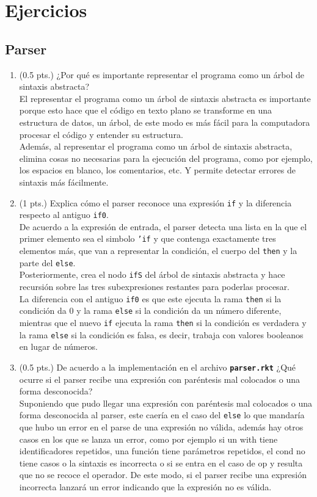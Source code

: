\documentclass[11pt]{article}
\begin{document}
\section{Ejercicios}
\subsection{Parser}
\begin{enumerate}
    \item (0.5 pts.) ¿Por qué es importante representar el programa como un árbol de sintaxis abstracta?\\
    El representar el programa como un árbol de sintaxis abstracta es importante porque esto hace que el código en texto plano se transforme en una estructura de datos, un árbol, de este modo es más fácil para la computadora procesar el código y entender su estructura.\\
    Además, al representar el programa como un árbol de sintaxis abstracta, elimina cosas no necesarias para la ejecución del programa, como por ejemplo, los espacios en blanco, los comentarios, etc. Y permite detectar errores de sintaxis más fácilmente.
    \item (1 pts.) Explica cómo el parser reconoce una expresión \texttt{if} y la diferencia respecto al antiguo \texttt{if0}.\\
    De acuerdo a la expresión de entrada, el parser detecta una lista en la que el primer elemento sea el simbolo \texttt{'if} y que contenga exactamente tres elementos más, que van a representar la condición, el cuerpo del \texttt{then} y la parte del \texttt{else}.\\
    Posteriormente, crea el nodo \texttt{ifS} del árbol de sintaxis abstracta y hace recursión sobre las tres subexpresiones restantes para poderlas procesar.\\
    La diferencia con el antiguo \texttt{if0} es que este ejecuta la rama \texttt{then} si la condición da 0 y la rama \texttt{else} si la condición da un número diferente, mientras que el nuevo \texttt{if} ejecuta la rama \texttt{then} si la condición es verdadera y la rama \texttt{else} si la condición es falsa, es decir, trabaja con valores booleanos en lugar de números.
    \item (0.5 pts.) De acuerdo a la implementación en el archivo \texttt{\textbf{parser.rkt}} ¿Qué ocurre si el parser recibe una expresión con paréntesis mal colocados o una forma desconocida?\\
    Suponiendo que pudo llegar una expresión con paréntesis mal colocados o una forma desconocida al parser, este caería en el caso del \texttt{else} lo que mandaría que hubo un error en el parse de una expresión no válida, además hay otros casos en los que se lanza un error, como por ejemplo si un with tiene identificadores repetidos, una función tiene parámetros repetidos, el cond no tiene casos o la sintaxis es incorrecta o si se entra en el caso de op y resulta que no se recoce el operador.
    De este modo, si el parser recibe una expresión incorrecta lanzará un error indicando que la expresión no es válida.

\end{enumerate}
\end{document}
